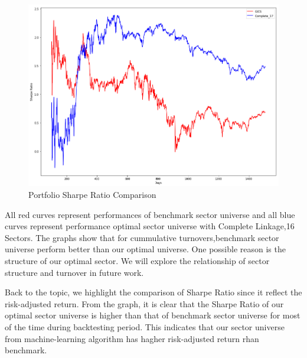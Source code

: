 \documentclass[../main.tex]{subfiles}
\begin{document}
 \begin{figure}[H]
    \centering
    \includegraphics[scale=0.4]{images/sharpe_compare.png}
    \caption{Portfolio Sharpe Ratio Comparison}
    \label{fig:benchmark_comparison:sharpe_comparison}
\end{figure}

All red curves represent performances of benchmark sector universe and all blue curves represent performance optimal sector universe with Complete Linkage,16 Sectors. The graphs show that for cummulative turnovers,benchmark sector universe perform better than our optimal universe. One possible reason is the structure of our optimal sector. We will explore the relationship of sector structure and turnover in future work. 

Back to the topic, we highlight the comparison of Sharpe Ratio since it reflect the risk-adjusted return. From the graph, it is clear that the Sharpe Ratio of our optimal sector universe is higher than that of benchmark sector universe for most of the time during backtesting period. This indicates that our sector universe from machine-learning algorithm has hagher risk-adjusted return rhan benchmark. 
\end{document}

